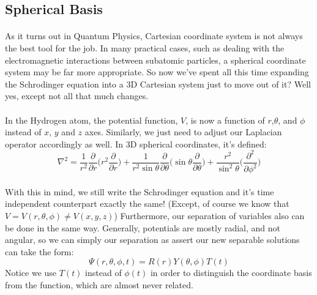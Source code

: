 \documentclass[12pt,letterpaper]{book}
\begin{document}
\subsection*{Spherical Basis}

\paragraph*{}As it turns out in Quantum Physics, Cartesian coordinate system is not always the best tool for the job. In many practical cases, such as dealing with the electromagnetic interactions between subatomic particles, a spherical coordinate system may be far more appropriate. So now we've spent all this time expanding the Schrodinger equation into a 3D Cartesian system just to move out of it? Well yes, except not all that much changes.

\paragraph*{}In the Hydrogen atom, the potential function, $V$, is now a function of $r$,$\theta$, and $\phi$ instead of $x$, $y$ and $z$ axes. Similarly, we just need to adjust our Laplacian operator accordingly as well. In 3D spherical coordinates, it's defined:
\begin{equation}
\label{3D Polar Laplacian}
\nabla^2 = \frac{1}{r^2} \frac{\partial}{\partial r} 
\bigg( r^2 \frac{\partial}{\partial r} \bigg) + 
\frac{1}{r^2 \sin\theta}\frac{\partial}{\partial \theta}
\bigg( \sin\theta \frac{\partial}{\partial \theta} \bigg) + 
\frac{r^2}{\sin^2\theta} 
\bigg( \frac{\partial^2}{\partial\phi^2} \bigg)
\end{equation}
\paragraph*{}With this in mind, we still write the Schrodinger equation and it's time independent counterpart exactly the same! (Except, of course we know that $V = V(r,\theta, \phi) \neq V(x,y,z)$) Furthermore, our separation of variables also can be done in the same way. Generally, potentials are mostly radial, and not angular, so we can simply our separation as assert our new separable solutions can take the form:
\begin{equation}
\Psi(r,\theta,\phi,t) = R(r) Y(\theta,\phi) T(t)
\end{equation}
Notice we use $T(t)$ instead of $\phi(t)$ in order to distinguish the coordinate basis from the function, which are almost never related.
\end{document}
